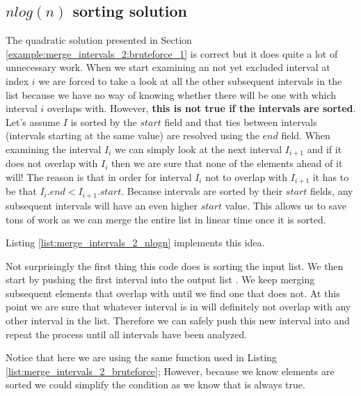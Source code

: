 \subsection{$nlog(n)$ sorting solution}
\label{example:merge_intervals_2:sorting_1}
The quadratic solution presented in Section \ref{example:merge_intervals_2:bruteforce_1} is correct but it does quite a lot of unnecessary work.
When we start examining an not yet excluded interval at index $i$ we are forced to take a look at all the other subsequent intervals in the list because we have no way of knowing whether there will be one with which interval $i$ overlaps with.
However, \textbf{this is not true if the intervals are sorted}. 
Let's assume $I$ is sorted by the $start$ field and that ties between intervals (intervals starting at the same value) are resolved using the $end$ field.
When examining the interval $I_i$ we can simply look at the next interval $I_{i+1}$ and if it does not overlap with $I_i$ then we are sure that none of the elements ahead of it will!
The reason is that in order for interval $I_i$ not to overlap with $I_{i+1}$ it has to be that $I_i.end < I_{i+1}.start$.
Because intervals are sorted by their $start$ fields, any subsequent intervals will have an even higher $start$ value. 
This allows us to save tons of work as we can merge the entire list in linear time once it is sorted. 

Listing \ref{list:merge_intervals_2_nlogn} implements this idea.



Not surprisingly the first thing this code does is sorting the input list.
We then start by pushing the first interval into the output list .
We keep merging subsequent elements that overlap with  until we find one that does not.
At this point we are sure that whatever interval is in  will definitely not overlap with any other interval in the list.
Therefore we can safely push this new interval into  and repeat the process until all intervals have been analyzed.

Notice that here we are using the same  function used in Listing \ref{list:merge_intervals_2_bruteforce};
However, because we know elements are sorted we could simplify the condition  as we know that  is always true.

